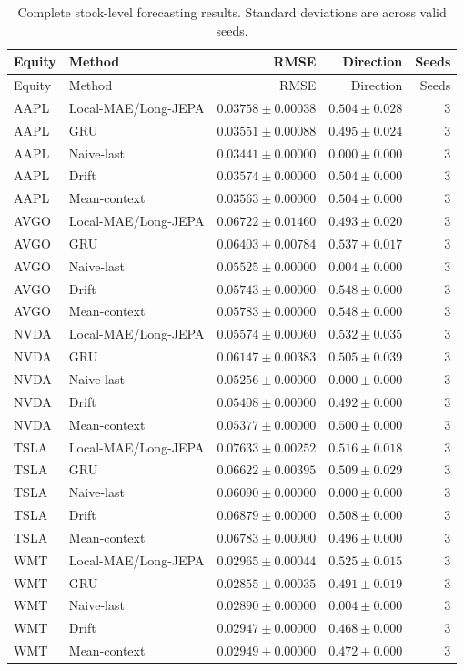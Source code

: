 \begin{longtable}{llrrr}
\caption{Complete stock-level forecasting results. Standard deviations are across valid seeds.}\label{tab:appendix_stock_metrics}\\
\toprule
Equity & Method & RMSE & Direction & Seeds \\
\midrule
\endfirsthead
\toprule
Equity & Method & RMSE & Direction & Seeds \\
\midrule
\endhead
AAPL & Local-MAE/Long-JEPA & $0.03758 \pm 0.00038$ & $0.504 \pm 0.028$ & 3 \\
AAPL & GRU & $0.03551 \pm 0.00088$ & $0.495 \pm 0.024$ & 3 \\
AAPL & Naive-last & $0.03441 \pm 0.00000$ & $0.000 \pm 0.000$ & 3 \\
AAPL & Drift & $0.03574 \pm 0.00000$ & $0.504 \pm 0.000$ & 3 \\
AAPL & Mean-context & $0.03563 \pm 0.00000$ & $0.504 \pm 0.000$ & 3 \\
AVGO & Local-MAE/Long-JEPA & $0.06722 \pm 0.01460$ & $0.493 \pm 0.020$ & 3 \\
AVGO & GRU & $0.06403 \pm 0.00784$ & $0.537 \pm 0.017$ & 3 \\
AVGO & Naive-last & $0.05525 \pm 0.00000$ & $0.004 \pm 0.000$ & 3 \\
AVGO & Drift & $0.05743 \pm 0.00000$ & $0.548 \pm 0.000$ & 3 \\
AVGO & Mean-context & $0.05783 \pm 0.00000$ & $0.548 \pm 0.000$ & 3 \\
NVDA & Local-MAE/Long-JEPA & $0.05574 \pm 0.00060$ & $0.532 \pm 0.035$ & 3 \\
NVDA & GRU & $0.06147 \pm 0.00383$ & $0.505 \pm 0.039$ & 3 \\
NVDA & Naive-last & $0.05256 \pm 0.00000$ & $0.000 \pm 0.000$ & 3 \\
NVDA & Drift & $0.05408 \pm 0.00000$ & $0.492 \pm 0.000$ & 3 \\
NVDA & Mean-context & $0.05377 \pm 0.00000$ & $0.500 \pm 0.000$ & 3 \\
TSLA & Local-MAE/Long-JEPA & $0.07633 \pm 0.00252$ & $0.516 \pm 0.018$ & 3 \\
TSLA & GRU & $0.06622 \pm 0.00395$ & $0.509 \pm 0.029$ & 3 \\
TSLA & Naive-last & $0.06090 \pm 0.00000$ & $0.000 \pm 0.000$ & 3 \\
TSLA & Drift & $0.06879 \pm 0.00000$ & $0.508 \pm 0.000$ & 3 \\
TSLA & Mean-context & $0.06783 \pm 0.00000$ & $0.496 \pm 0.000$ & 3 \\
WMT & Local-MAE/Long-JEPA & $0.02965 \pm 0.00044$ & $0.525 \pm 0.015$ & 3 \\
WMT & GRU & $0.02855 \pm 0.00035$ & $0.491 \pm 0.019$ & 3 \\
WMT & Naive-last & $0.02890 \pm 0.00000$ & $0.004 \pm 0.000$ & 3 \\
WMT & Drift & $0.02947 \pm 0.00000$ & $0.468 \pm 0.000$ & 3 \\
WMT & Mean-context & $0.02949 \pm 0.00000$ & $0.472 \pm 0.000$ & 3 \\
\bottomrule
\end{longtable}
